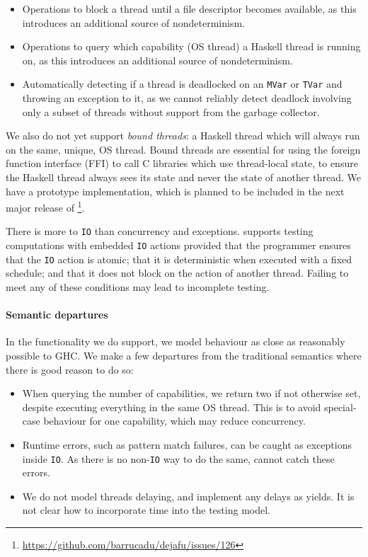 \begin{itemize}
\item Operations to block a thread until a file descriptor becomes
  available, as this introduces an additional source of
  nondeterminism.

\item Operations to query which capability (OS thread) a Haskell
  thread is running on, as this introduces an additional source of
  nondeterminism.

\item Automatically detecting if a thread is deadlocked on an
  \verb|MVar| or \verb|TVar| and throwing an exception to it, as we
  cannot reliably detect deadlock involving only a subset of threads
  without support from the garbage collector.
\end{itemize}

We also do not yet support \emph{bound threads}: a Haskell thread
which will always run on the same, unique, OS thread.  Bound threads
are essential for using the foreign function interface (FFI) to call C
libraries which use thread-local state, to ensure the Haskell thread
always sees its state and never the state of another thread.  We have
a prototype implementation, which is planned to be included in the
next major release of
\dejafu{}\footnote{\url{https://github.com/barrucadu/dejafu/issues/126}}.

There is more to \verb|IO| than concurrency and exceptions.  \dejafu{} supports
testing computations with embedded \verb|IO| actions provided that the
programmer ensures that the \verb|IO| action is atomic; that it is deterministic
when executed with a fixed schedule; and that it does not block on the action of
another thread.  Failing to meet any of these conditions may lead to incomplete
testing.

\paragraph{Semantic departures}
In the functionality we do support, we model behaviour as close as
reasonably possible to GHC.  We make a few departures from the
traditional semantics where there is good reason to do so:

\begin{itemize}
\item When querying the number of capabilities, we return two if not
  otherwise set, despite executing everything in the same OS thread.
  This is to avoid special-case behaviour for one capability, which
  may reduce concurrency.

\item Runtime errors, such as pattern match failures, can be caught as
  exceptions inside \verb|IO|.  As there is no non-\verb|IO| way to do
  the same, \dejafu{} cannot catch these errors.

\item We do not model threads delaying, and implement any delays as
  yields.  It is not clear how to incorporate time into the testing
  model.
\end{itemize}

